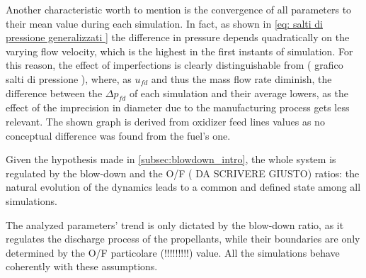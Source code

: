 Another characteristic worth to mention is the convergence of all parameters to their mean value during each simulation.
In fact, as shown in \autoref{eq: salti di pressione generalizzati } the difference in pressure depends quadratically on the varying flow velocity, which is the highest in the first instants of simulation. 
For this reason, the effect of imperfections is clearly distinguishable from ( grafico salti di pressione ), where, as $u_{fd}$ and thus the mass flow rate diminish, the difference between the $\Delta p_{fd}$ of each simulation and their average lowers, as the effect of the imprecision in diameter due to the manufacturing process gets less relevant. The shown graph is derived from oxidizer feed lines values as no conceptual difference was found from the fuel's one. 

Given the hypothesis made in \autoref{subsec:blowdown_intro}, the whole system is regulated by the blow-down and the O/F ( DA SCRIVERE GIUSTO) ratios: the natural evolution of the dynamics leads to a common and defined state among all simulations.

The analyzed parameters' trend is only dictated by the blow-down ratio, as it regulates the discharge process of the propellants, while their boundaries are only determined by the O/F particolare (!!!!!!!!!) value. All the simulations behave coherently  with these assumptions. 











